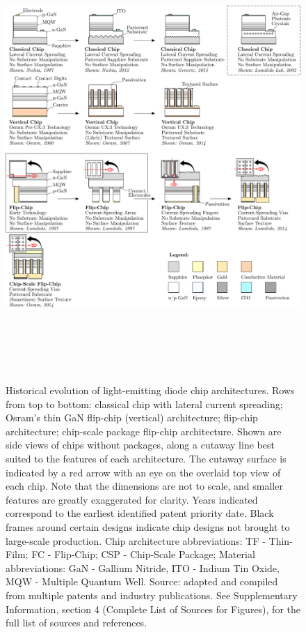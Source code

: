 \documentclass[twoside,twocolumn,9pt]{article}
\begin{document}
\begin{figure}
 \centering
 \includegraphics[height=17cm]{2_SSL_EES/article/figures/chip_architecture_overview.pdf}
 \caption{Historical evolution of light-emitting diode chip architectures. Rows from top to bottom: classical chip with lateral current spreading; Osram’s thin GaN flip-chip (vertical) architecture; flip-chip architecture; chip-scale package flip-chip architecture. Shown are side views of chips without packages, along a cutaway line best suited to the features of each architecture. The cutaway surface is indicated by a red arrow with an eye on the overlaid top view of each chip. Note that the dimensions are not to scale, and smaller features are greatly exaggerated for clarity. Years indicated correspond to the earliest identified patent priority date. Black frames around certain designs indicate chip designs not brought to large-scale production. Chip architecture abbreviations: TF - Thin-Film; FC - Flip-Chip; CSP - Chip-Scale Package; Material abbreviations: GaN - Gallium Nitride, ITO - Indium Tin Oxide, MQW - Multiple Quantum Well. Source: adapted and compiled from multiple patents and industry publications. See Supplementary Information, section 4 (Complete List of Sources for Figures), for the full list of sources and references.}
 \label{fgr:chip_architecture_overview}
\end{figure}
\end{document}

